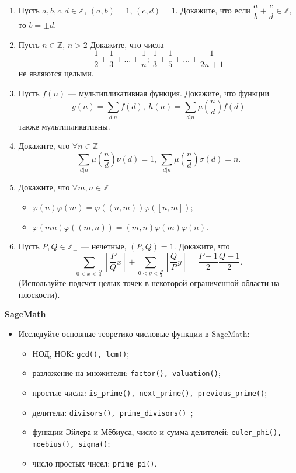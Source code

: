 \begin{enumerate}[topsep=0pt]
    \item Пусть $a,b,c,d \in \mathbb{Z}$, $(a,b)=1$, $(c,d)=1$. Докажите, что если $\dfrac{a}{b}+\dfrac{c}{d} \in \mathbb{Z}$, то $b=\pm d$.
    \item Пусть $n \in \mathbb{Z}$, $n>2$ Докажите, что числа
    $$
    \dfrac{1}{2}+\dfrac{1}{3}+\dots+\dfrac{1}{n};\ 
        \dfrac{1}{3}+\dfrac{1}{5}+\dots+\dfrac{1}{2n+1}
    $$
    не являются целыми.
    \item Пусть $f(n)$ --- мультипликативная функция. Докажите, что функции
    $$
        g(n)=\sum\limits_{d|n} f(d),\ 
        h(n)=\sum\limits_{d|n} \mu(\frac{n}{d})f(d)
    $$
    также мультипликативны.
    \item Докажите, что $\forall n \in \mathbb{Z}$
    $$
    \sum\limits_{d|n} \mu(\frac{n}{d}) \nu(d) = 1,\ 
        \sum\limits_{d|n} \mu(\frac{n}{d}) \sigma(d) = n.
    $$
    \item Докажите, что $\forall m,n \in \mathbb{Z}$
    \begin{itemize}[noitemsep,topsep=0pt]
        \item $\varphi(n)\varphi(m)=\varphi((n,m))\varphi([n,m])$;
        \item $\varphi(mn)\varphi((m,n))=(m,n)\varphi(m)\varphi(n)$.
    \end{itemize}
    \item Пусть $P,Q\in\mathbb{Z}_+$ --- нечетные, $(P,Q)=1$. Докажите, что 
    $$
    \sum_{0<x<\frac{Q}{2}}\left[\frac{P}{Q}x\right] + \sum_{0<y<\frac{P}{2}}\left[\frac{Q}{P}y\right] = \frac{P-1}{2}\frac{Q-1}{2}.
    $$
    (Используйте подсчет целых точек в некоторой ограниченной области на плоскости).
    
\end{enumerate}

\noindent\textbf{SageMath}

\begin{itemize}[topsep=0pt]

    \item Исследуйте основные теоретико-числовые функции в SageMath:
    \begin{itemize}[noitemsep,topsep=0pt]
        \item НОД, НОК: \texttt{gcd(), lcm()};
        \item разложение на множители: \texttt{factor(), valuation()};
        \item простые числа: \texttt{is\_prime(), next\_prime(), previous\_prime()};
        \item делители: \texttt{divisors(), prime\_divisors() };
        \item функции Эйлера и Мёбиуса, число и сумма делителей: \texttt{euler\_phi(), moebius(), sigma()};
        \item число простых чисел: \texttt{prime\_pi()}.
    \end{itemize}
    
\end{itemize}


